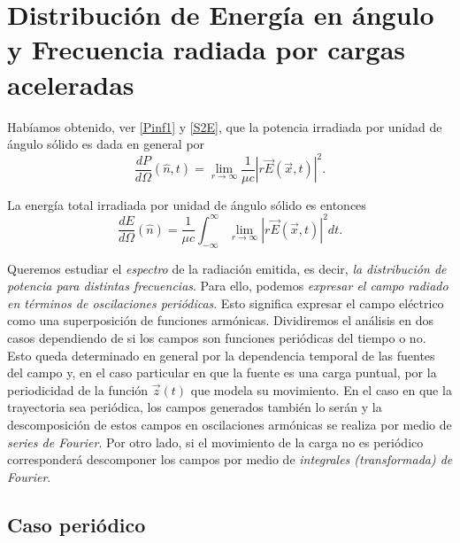 \section{Distribución de Energía en ángulo y Frecuencia radiada
por cargas aceleradas}

Habíamos obtenido, ver \eqref{Pinf1} y \eqref{S2E}, que la potencia irradiada por unidad de ángulo sólido es dada en general por
\begin{equation}\label{dp1}
\frac{dP}{d\Omega}(\hat{n},t)=\lim_{r\to\infty}\frac{1}{\mu c}\left|r\vec{E}(\vec{x},t)\right|^2 .
\end{equation}

La energía total irradiada por unidad de ángulo sólido es entonces
\begin{equation}
\frac{dE}{d\Omega}(\hat{n}) =\frac{1}{\mu c}\int_{-\infty}^{\infty}\lim_{r\to\infty}\left|r\vec{E}(\vec{x},t)\right|^2 dt .
\end{equation}

Queremos estudiar el \textit{espectro} de la radiación emitida, es decir, \textit{la distribución de potencia para distintas frecuencias}. Para ello, podemos \textit{expresar el campo radiado en términos de oscilaciones periódicas}. Esto significa expresar el campo eléctrico como una superposición de funciones armónicas. Dividiremos el análisis en dos casos dependiendo de si los campos son funciones periódicas del tiempo o no. Esto queda determinado en general por la dependencia temporal de las fuentes del campo y, en el caso particular en que la fuente es una carga puntual, por la periodicidad de la función $\vec{z}(t)$ que modela su movimiento. En el caso en que la trayectoria sea periódica, los campos generados también lo serán y la descomposición de estos campos en oscilaciones armónicas se realiza por medio de \textit{series de Fourier}. Por otro lado, si el movimiento de la carga no es periódico corresponderá descomponer los campos por medio de \textit{integrales (transformada) de Fourier}.

\subsection{Caso periódico}\label{sec:rfp}



